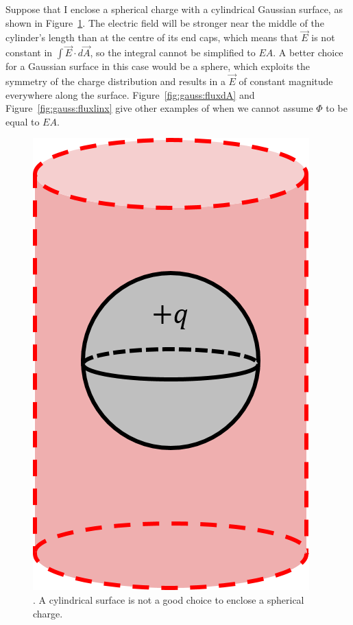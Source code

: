 \begin{framed}
Suppose that I enclose a spherical charge with a cylindrical Gaussian surface, as shown in Figure~\ref{fig:gauss:dontchoosecylinder}. The electric field will be stronger near the middle of the cylinder's length than at the centre of its end caps, which means that $\vec E$ is not constant in $\int \vec E \cdot d \vec A$, so the integral cannot be simplified to $EA$. A better choice for a Gaussian surface in this case would be a sphere, which exploits the symmetry of the charge distribution and results in a $\vec E$ of constant magnitude everywhere along the surface. Figure~\ref{fig:gauss:fluxdA} and Figure~\ref{fig:gauss:fluxlinx} give other examples of when we cannot assume $\Phi$ to be equal to $EA$.

\begin{figure}[!htbp]
\centering
\includegraphics[width=0.2\linewidth]{files/dontchoosecylinder-ab9276b288b9db308f37157107ffbc73.png}
\caption[]{. A cylindrical surface is not a good choice to enclose a spherical charge.}
\label{fig:gauss:dontchoosecylinder}
\end{figure}
\end{framed}


